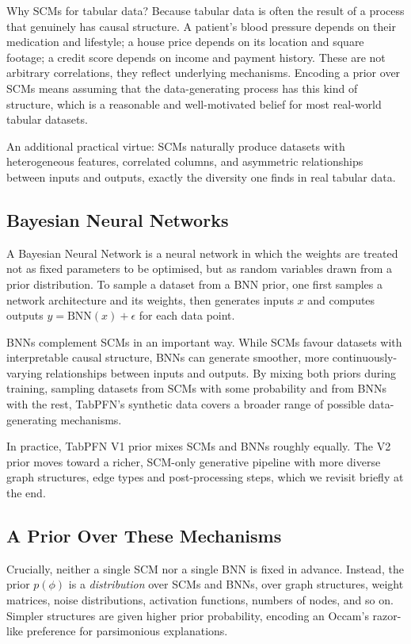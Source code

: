 \documentclass[12pt]{article}
\begin{document}
Why SCMs for tabular data? Because tabular data is often the result of a process that genuinely has causal structure. A patient's blood pressure depends on their medication and lifestyle; a house price depends on its location and square footage; a credit score depends on income and payment history. These are not arbitrary correlations,  they reflect underlying mechanisms. Encoding a prior over SCMs means assuming that the data-generating process has this kind of structure, which is a reasonable and well-motivated belief for most real-world tabular datasets.

An additional practical virtue: SCMs naturally produce datasets with heterogeneous features, correlated columns, and asymmetric relationships between inputs and outputs,  exactly the diversity one finds in real tabular data.

\subsection{Bayesian Neural Networks}

A Bayesian Neural Network \cite{neal1996bayesian} is a neural network in which the weights are treated not as fixed parameters to be optimised, but as random variables drawn from a prior distribution. To sample a dataset from a BNN prior, one first samples a network architecture and its weights, then generates inputs $x$ and computes outputs $y = \text{BNN}(x) + \epsilon$ for each data point.

BNNs complement SCMs in an important way. While SCMs favour datasets with interpretable causal structure, BNNs can generate smoother, more continuously-varying relationships between inputs and outputs. By mixing both priors during training,  sampling datasets from SCMs with some probability and from BNNs with the rest,  TabPFN's synthetic data covers a broader range of possible data-generating mechanisms.

In practice, TabPFN V1 prior mixes SCMs and BNNs roughly equally. The V2 prior moves toward a richer, SCM-only generative pipeline with more diverse graph structures, edge types and post-processing steps, which we revisit briefly at the end.

\subsection{A Prior Over These Mechanisms}

Crucially, neither a single SCM nor a single BNN is fixed in advance. Instead, the prior $p(\phi)$ is a \emph{distribution} over SCMs and BNNs,  over graph structures, weight matrices, noise distributions, activation functions, numbers of nodes, and so on. Simpler structures are given higher prior probability, encoding an Occam's razor-like preference for parsimonious explanations.
\end{document}
